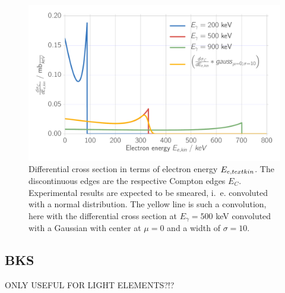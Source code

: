 \begin{figure}[htpb]
    \centering
    \includegraphics[width=0.8\linewidth]{analysis/figures/theory_dsde}
    \caption{
        Differential cross section in terms of electron energy $E_{e, \\text{kin}}$. The discontinuous edges 
        are the respective Compton edges $E_C$. Experimental results are expected to be smeared, i.~e. convoluted with a 
        normal distribution. The yellow line is such a convolution, here with the differential cross section at
        $E_\gamma = 500$ keV convoluted with a Gaussian with center at $\mu = 0$ and a width of $\sigma = 10$. 
        }
    \label{fig:theory_dsde}
\end{figure}


\subsection{BKS}
\label{sec:BKS}


ONLY USEFUL FOR LIGHT ELEMENTS?!?
